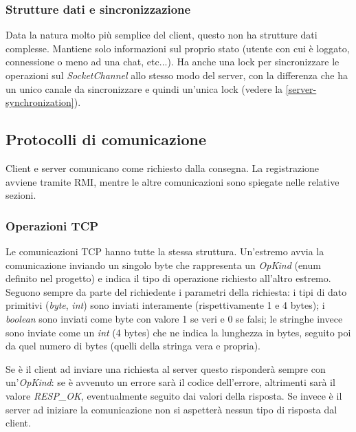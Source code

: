 \documentclass[a4paper]{article}
\theoremstyle{theorem}
\theoremstyle{remark}
\theoremstyle{definition}
\theoremstyle{corollary}
\theoremstyle{lemma}
\begin{document}
\subsubsection{Strutture dati e sincronizzazione}
Data la natura molto più semplice del client, questo non ha strutture dati complesse. Mantiene solo informazioni sul proprio stato (utente con cui è loggato, connessione o meno ad una chat, etc...). Ha anche una lock per sincronizzare le operazioni sul \textit{SocketChannel} allo stesso modo del server, con la differenza che ha un unico canale da sincronizzare e quindi un'unica lock (vedere la \autoref{server-synchronization}).


\subsection{Protocolli di comunicazione}\label{comunication-protocols}
Client e server comunicano come richiesto dalla consegna. La registrazione avviene tramite RMI, mentre le altre comunicazioni sono spiegate nelle relative sezioni.

\subsubsection{Operazioni TCP}\label{comunication-tcp}
Le comunicazioni TCP hanno tutte la stessa struttura. Un'estremo avvia la comunicazione inviando un singolo byte che rappresenta un \textit{OpKind} (enum definito nel progetto) e indica il tipo di operazione richiesto all'altro estremo. Seguono sempre da parte del richiedente i parametri della richiesta: i tipi di dato primitivi (\textit{byte}, \textit{int}) sono inviati interamente (rispettivamente 1 e 4 bytes); i \textit{boolean} sono inviati come byte con valore 1 se veri e 0 se falsi; le stringhe invece sono inviate come un \textit{int} (4 bytes) che ne indica la lunghezza in bytes, seguito poi da quel numero di bytes (quelli della stringa vera e propria).

Se è il client ad inviare una richiesta al server questo risponderà sempre con un'\textit{OpKind}: se è avvenuto un errore sarà il codice dell'errore, altrimenti sarà il valore \textit{RESP\_OK}, eventualmente seguito dai valori della risposta. Se invece è il server ad iniziare la comunicazione non si aspetterà nessun tipo di risposta dal client.
\end{document}
